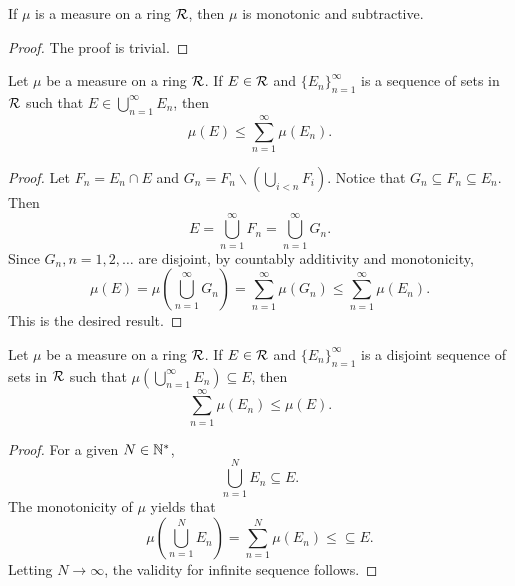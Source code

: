 \begin{thm}
If $\mu$ is a measure on a ring $\mathcal{R}$, then $\mu$ is monotonic and 
subtractive. 
\end{thm}
\begin{proof}
The proof is trivial. 
\end{proof}

\begin{thm}
Let $\mu$ be a measure on a ring $\mathcal{R}$. If $E \in \mathcal{R}$ and 
$\{E_n\}_{n=1}^\infty$ is a sequence of sets in $\mathcal{R}$ such that $E 
\in \bigcup_{n=1}^\infty E_n$, then 
\begin{equation*}
    \mu(E) \le \sum_{n = 1}^\infty \mu(E_n). 
\end{equation*}
\end{thm}
\begin{proof}
Let $F_n = E_n \cap E$ and $G_n = F_n \backslash \left( \bigcup_{i < n} F_i 
\right)$. 
Notice that $G_n \subseteq F_n \subseteq E_n$. 
Then 
\begin{equation*}
    E = \bigcup_{n=1}^\infty F_n = \bigcup_{n=1}^\infty G_n. 
\end{equation*}
Since $G_n, n = 1, 2, \ldots$ are disjoint, by countably additivity and 
monotonicity, 
\begin{equation*}
    \mu(E) = \mu\left( \bigcup_{n=1}^\infty G_n \right) 
    = \sum_{n=1}^\infty \mu(G_n) \le \sum_{n=1}^\infty \mu(E_n).  
\end{equation*}
This is the desired result. 
\end{proof}

\begin{thm}
Let $\mu$ be a measure on a ring $\mathcal{R}$. If $E \in \mathcal{R}$ and $\{E_n\}_{n=1}
^\infty$ is a disjoint sequence of sets in $\mathcal{R}$ such that $\mu\left( 
\bigcup_{n=1}^\infty E_n \right) \subseteq E$, then 
\begin{equation*}
    \sum_{n=1}^\infty \mu(E_n) \le \mu(E). 
\end{equation*}
\end{thm}
\begin{proof}
For a given $N \in \mathbb{N}^\ast$, 
\begin{equation*}
    \bigcup_{n=1}^N E_n \subseteq E. 
\end{equation*}
The monotonicity of $\mu$ yields that 
\begin{equation*}
    \mu\left( \bigcup_{n=1}^N E_n \right) = \sum_{n=1}^N \mu(E_n) \le \subseteq E. 
\end{equation*}
Letting $N \to \infty$, the validity for infinite sequence follows. 
\end{proof}


